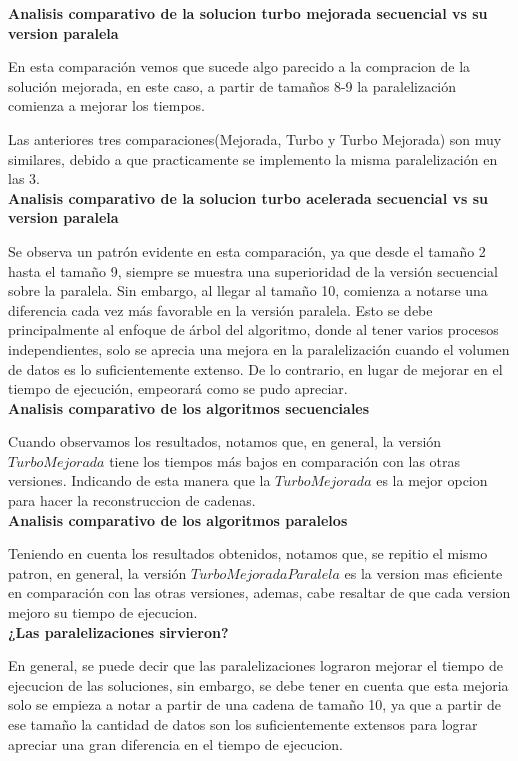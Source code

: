 \documentclass[conference]{IEEEtran}
\begin{document}
\textbf{Analisis comparativo de la solucion turbo mejorada secuencial vs su version paralela}

En esta comparación vemos que sucede algo parecido a la compracion de la solución mejorada, en este caso, a partir de tamaños 8-9 la paralelización comienza a mejorar los tiempos.

Las anteriores tres comparaciones(Mejorada, Turbo y Turbo Mejorada) son muy similares, debido a que practicamente se implemento la misma paralelización en las 3.\\

\textbf{Analisis comparativo de la solucion turbo acelerada secuencial vs su version paralela}

Se observa un patrón evidente en esta comparación, ya que desde el tamaño 2 hasta el tamaño 9, siempre se muestra una superioridad de la versión secuencial sobre la paralela. Sin embargo, al llegar al tamaño 10, comienza a notarse una diferencia cada vez más favorable en la versión paralela. Esto se debe principalmente al enfoque de árbol del algoritmo, donde al tener varios procesos independientes, solo se aprecia una mejora en la paralelización cuando el volumen de datos es lo suficientemente extenso. De lo contrario, en lugar de mejorar en el tiempo de ejecución, empeorará como se pudo apreciar.\\

\textbf{Analisis comparativo de los algoritmos secuenciales}

Cuando observamos los resultados, notamos que, en general, la versión $Turbo Mejorada$ tiene los tiempos más bajos en comparación con las otras versiones. Indicando de esta manera que la $Turbo Mejorada$ es la mejor opcion para hacer la reconstruccion de cadenas.\\

\textbf{Analisis comparativo de los algoritmos paralelos}

Teniendo en cuenta los resultados obtenidos, notamos que, se repitio el mismo patron, en general, la versión $Turbo Mejorada Paralela$ es la version mas eficiente en comparación con las otras versiones, ademas, cabe resaltar de que cada version mejoro su tiempo de ejecucion.\\

\textbf{¿Las paralelizaciones sirvieron?}

En general, se puede decir que las paralelizaciones lograron mejorar el tiempo de ejecucion de las soluciones, sin embargo, se debe tener en cuenta que esta mejoria solo se empieza a notar a partir de una cadena de tamaño 10, ya que a partir de ese tamaño la cantidad de datos son los suficientemente extensos para lograr apreciar una gran diferencia en el tiempo de ejecucion. 
\end{document}
